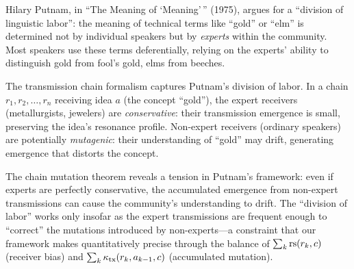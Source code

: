 \begin{interpretation}\label{interp:ch7:putnam_linguistic_labor}
Hilary Putnam, in ``The Meaning of `Meaning'\,'' (1975), argues for a
``division of linguistic labor'': the meaning of technical terms like
``gold'' or ``elm'' is determined not by individual speakers but by
\emph{experts} within the community. Most speakers use these terms
deferentially, relying on the experts' ability to distinguish gold from
fool's gold, elms from beeches.

The transmission chain formalism captures Putnam's division of labor.
In a chain $r_1, r_2, \ldots, r_n$ receiving idea $a$ (the concept
``gold''), the expert receivers (metallurgists, jewelers) are
\emph{conservative}: their transmission emergence is small, preserving
the idea's resonance profile. Non-expert receivers (ordinary speakers)
are potentially \emph{mutagenic}: their understanding of ``gold'' may
drift, generating emergence that distorts the concept.

The chain mutation theorem reveals a tension in Putnam's framework:
even if experts are perfectly conservative, the accumulated emergence
from non-expert transmissions can cause the community's understanding
to drift. The ``division of labor'' works only insofar as the expert
transmissions are frequent enough to ``correct'' the mutations
introduced by non-experts---a constraint that our framework makes
quantitatively precise through the balance of $\sum_k \mathrm{rs}(r_k, c)$
(receiver bias) and $\sum_k \kappa_{\text{tx}}(r_k, a_{k-1}, c)$
(accumulated mutation).
\end{interpretation}

